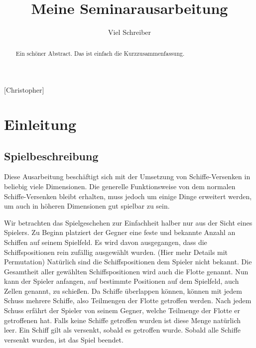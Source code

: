 \documentclass[a4paper,12pt]{llncs}
\numberwithin{equation}{section}
\begin{document}

\author{Viel Schreiber}

\title{Meine Seminarausarbeitung}

\maketitle

\thispagestyle{empty}

\begin{abstract}
Ein schöner Abstract. Das ist einfach die Kurzzusammenfassung.
\end{abstract}

[Christopher]

\section{Einleitung}

\subsection{Spielbeschreibung}
Diese Ausarbeitung beschäftigt sich mit der Umsetzung von Schiffe-Versenken in beliebig viele Dimensionen.
Die generelle Funktionsweise von dem normalen Schiffe-Versenken bleibt erhalten, muss jedoch um einige Dinge erweitert werden, um auch in höheren Dimensionen gut spielbar zu sein.

Wir betrachten das Spielgeschehen zur Einfachheit halber nur aus der Sicht eines Spielers.
Zu Beginn platziert der Gegner eine feste und bekannte Anzahl an Schiffen auf seinem Spielfeld. Es wird davon ausgegangen, dass die Schiffspositionen rein zufällig ausgewählt wurden. (Hier mehr Details mit Permutation)
Natürlich sind die Schiffspositionen dem Spieler nicht bekannt.
Die Gesamtheit aller gewählten Schiffspositionen wird auch die Flotte genannt.
Nun kann der Spieler anfangen, auf bestimmte Positionen auf dem Spielfeld, auch Zellen genannt, zu schießen.
Da Schiffe überlappen können, können mit jedem Schuss mehrere Schiffe, also Teilmengen der Flotte getroffen werden.
Nach jedem Schuss erfährt der Spieler von seinem Gegner, welche Teilmenge der Flotte er getroffenen hat.
Falls keine Schiffe getroffen wurden ist diese Menge natürlich leer.
Ein Schiff gilt als versenkt, sobald es getroffen wurde.
Sobald alle Schiffe versenkt wurden, ist das Spiel beendet.
\end{document}
